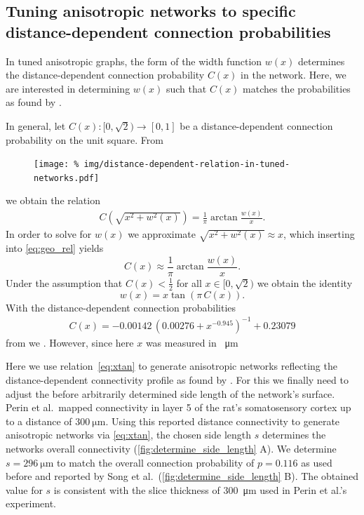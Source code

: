 
\bigskip

\subsection{Tuning anisotropic networks to specific distance-dependent
  connection probabilities}
\label{sec:tuned_networks}


In tuned anisotropic graphs, the form of the width function $w(x)$
determines the distance-dependent connection probability $C(x)$ in the
network. Here, we are interested in determining $w(x)$ such that
$C(x)$ matches the probabilities as found by \textcite{Perin2011}.

In general, let $C(x): [0,\sqrt{2}) \to [0,1]$ be a distance-dependent
  connection probability on the unit square. From

  \begin{figure}[h!]
    \centering
    \texttt{[image: \%
    img/distance-dependent-relation-in-tuned-networks.pdf]} %
  \end{figure}

 we obtain the relation
%
\begin{align}
C\left(\sqrt{x^2+w^2(x)}\right) = \frac{1}{\pi} \operatorname{arctan}
\frac{w(x)}{x}. \label{eq:geo_rel}
\end{align}
%
In order to solve for $w(x)$ we approximate $\sqrt{x^2 + w^2(x)}
\approx x$, which inserting into \eqref{eq:geo_rel} yields
\begin{equation}
C(x) \approx \frac{1}{\pi} \operatorname{arctan} \label{eq:tanapprox}
\frac{w(x)}{x}.
\end{equation}
%
Under the assumption that $C(x)<\frac{1}{2}$ for all $x \in
[0,\sqrt{2})$ we obtain the identity
\begin{equation}
  w(x) = x \tan\left( \pi\, C(x) \right). \label{eq:xtan}
\end{equation} 
%
With the distance-dependent connection probabilities
\begin{align}
C(x) = -0.00142\, \left(0.00276 + x^{-0.945}\right)^{-1} + 0.23079
\end{align}
%
from \textcite{Perin2011} we . However, since here $x$ was measured in
\SI{}{\micro\meter}

Here we use relation~\ref{eq:xtan} to generate anisotropic networks
reflecting the dis\-tance-de\-pendent connectivity profile as found by
\textcite{Perin2011}. For this we finally need to adjust the before
arbitrarily determined side length of the network's surface. Perin et
al.~mapped connectivity in layer 5 of the rat's somatosensory cortex
up to a distance of $\SI{300}{\micro\meter}$. Using this reported
distance connectivity to generate anisotropic networks via
\ref{eq:xtan}, the chosen side length $s$ determines the networks
overall connectivity (\autoref{fig:determine_side_length} A). We
determine $s = \SI{296}{\micro\meter}$ to match the overall connection
probability of $p = 0.116$ as used before and reported by Song et
al.~(\autoref{fig:determine_side_length} B). The obtained value for
$s$ is consistent with the slice thickness of \SI{300}{\micro\meter}
used in Perin et al.'s experiment.


